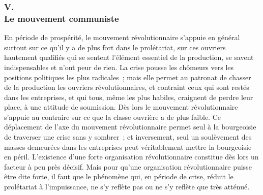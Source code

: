 \documentclass[french,twoside]{book} %
\begin{document}
\subsubsection[{V. Le mouvement communiste}]{V. \\
Le mouvement communiste}
\noindent En période de prospérité, le mouvement révolutionnaire s'appuie en général surtout sur ce qu'il y a de plus fort dans le prolétariat, sur ces ouvriers hautement qualifiés qui se sentent l'élément essentiel de la production, se savent indispensables et n'ont peur de rien. La crise pousse les chômeurs vers les positions politiques les plus radicales ; mais elle permet au patronat de chasser de la production les ouvriers révolutionnaires, et contraint ceux qui sont restés dans les entreprises, et qui tous, même les plus habiles, craignent de perdre leur place, à une attitude de soumission. Dès lors le mouvement révolutionnaire s'appuie au contraire sur ce que la classe ouvrière a de plus faible. Ce déplacement de l'axe du mouvement révolutionnaire permet seul à la bourgeoisie de traverser une crise sans y sombrer ; et inversement, seul un soulèvement des masses demeurées dans les entreprises peut véritablement mettre la bourgeoisie en péril. L'existence d'une forte organisation révolution­naire constitue dès lors un facteur à peu près décisif. Mais pour qu'une organisation révolutionnaire puisse être dite forte, il faut que le phénomène qui, en période de crise, réduit le prolétariat à l'impuissance, ne s'y reflète pas ou ne s'y reflète que très atténué.\par
\end{document}
